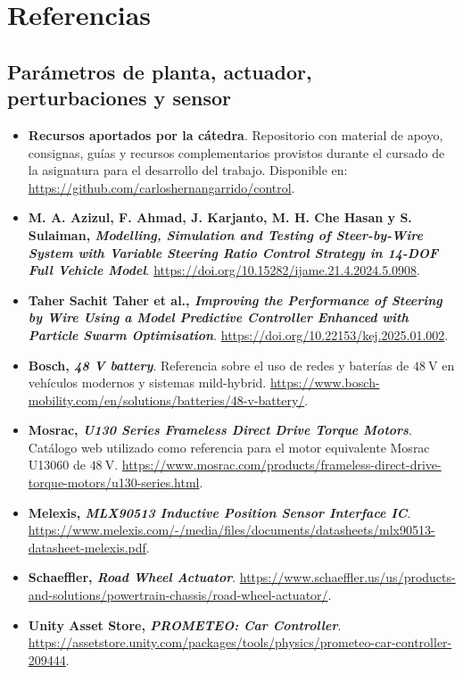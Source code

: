 \documentclass{article}
\begin{document}
\section{Referencias}

\subsection*{Parámetros de planta, actuador, perturbaciones y sensor}

\begin{itemize}
    \item \hypertarget{ref:recursos-catedra}{}\textbf{Recursos aportados por la cátedra}. Repositorio con material de apoyo, consignas, guías y recursos complementarios provistos durante el cursado de la asignatura para el desarrollo del trabajo. Disponible en: \url{https://github.com/carloshernangarrido/control}.
    
    \item \hypertarget{ref:azizul-2024}{}\textbf{M. A. Azizul, F. Ahmad, J. Karjanto, M. H. Che Hasan y S. Sulaiman, \textit{Modelling, Simulation and Testing of Steer-by-Wire System with Variable Steering Ratio Control Strategy in 14-DOF Full Vehicle Model}}. \url{https://doi.org/10.15282/ijame.21.4.2024.5.0908}.
    
    \item \hypertarget{ref:taher-2025}{}\textbf{Taher Sachit Taher et al., \textit{Improving the Performance of Steering by Wire Using a Model Predictive Controller Enhanced with Particle Swarm Optimisation}}. \url{https://doi.org/10.22153/kej.2025.01.002}.
    
    \item \hypertarget{ref:bosch-48v}{}\textbf{Bosch, \textit{48 V battery}}. Referencia sobre el uso de redes y baterías de $48\ \mathrm{V}$ en vehículos modernos y sistemas mild-hybrid. \url{https://www.bosch-mobility.com/en/solutions/batteries/48-v-battery/}.

    \item \hypertarget{ref:mosrac-u13060}{}\textbf{Mosrac, \textit{U130 Series Frameless Direct Drive Torque Motors}}. Catálogo web utilizado como referencia para el motor equivalente Mosrac U13060 de $48\ \mathrm{V}$. \url{https://www.mosrac.com/products/frameless-direct-drive-torque-motors/u130-series.html}.  

    \item \hypertarget{ref:mlx90513}{}\textbf{Melexis, \textit{MLX90513 Inductive Position Sensor Interface IC}}. \url{https://www.melexis.com/-/media/files/documents/datasheets/mlx90513-datasheet-melexis.pdf}.

    \item \hypertarget{ref:schaeffler-rwa}{}\textbf{Schaeffler, \textit{Road Wheel Actuator}}. \url{https://www.schaeffler.us/us/products-and-solutions/powertrain-chassis/road-wheel-actuator/}.

    \item \hypertarget{ref:prometeo-car-controller}{}\textbf{Unity Asset Store, \textit{PROMETEO: Car Controller}}. \url{https://assetstore.unity.com/packages/tools/physics/prometeo-car-controller-209444}.
\end{itemize}
\end{document}
